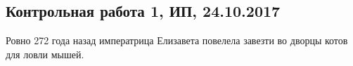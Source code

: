 \begin{enumerate}





\end{enumerate}



\subsection{Контрольная работа 1, ИП, 24.10.2017}


Ровно 272 года назад императрица Елизавета повелела завезти во дворцы котов для ловли мышей.


